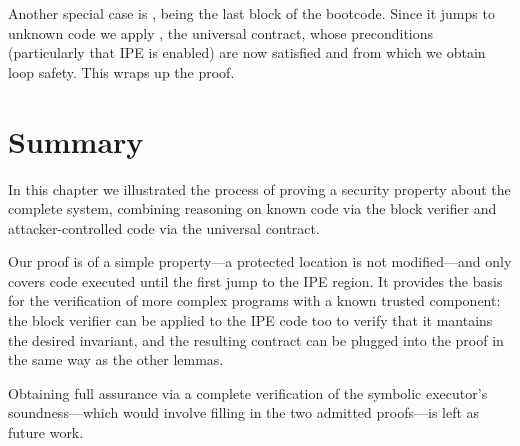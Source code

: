 Another special case is , being the last block of the bootcode. Since it jumps to unknown code we apply , \ie the universal contract, whose preconditions (particularly that IPE is enabled) are now satisfied and from which we obtain loop safety. This wraps up the proof.

\section{Summary}

In this chapter we illustrated the process of proving a security property about the complete system, combining reasoning on known code via the block verifier and attacker-controlled code via the universal contract.

Our proof is of a simple property---a protected location is not modified---and only covers code executed until the first jump to the IPE region. It provides the basis for the verification of more complex programs with a known trusted component: the block verifier can be applied to the IPE code too to verify that it mantains the desired invariant, and the resulting contract can be plugged into the proof in the same way as the other  lemmas.

Obtaining full assurance via a complete verification of the symbolic executor's soundness---which would involve filling in the two admitted proofs---is left as future work.
